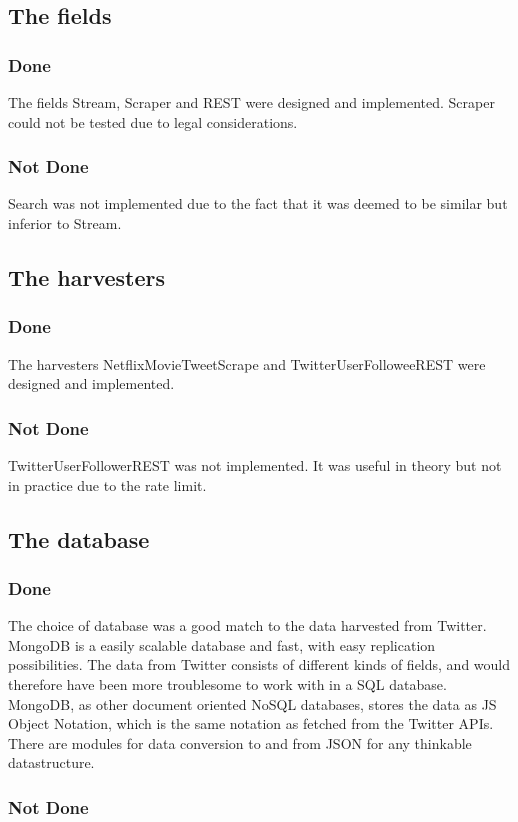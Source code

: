 \subsection{The fields}
\subsubsection{Done}
The fields Stream, Scraper and REST were designed and implemented. Scraper could not be tested due to legal considerations.
\subsubsection{Not Done}
Search was not implemented due to the fact that it was deemed to be similar but inferior to Stream.

\subsection{The harvesters}
\subsubsection{Done}
The harvesters NetflixMovieTweetScrape
and TwitterUserFolloweeREST were designed and implemented.
\subsubsection{Not Done}
TwitterUserFollowerREST was not implemented. It was useful in theory but not in practice due to the rate limit.

\subsection{The database}
\subsubsection{Done}
The choice of database was a good match to the data harvested from Twitter. MongoDB is a easily scalable database and fast, with easy replication possibilities. The data from Twitter consists of different kinds of fields, and would therefore have been more troublesome to work with in a SQL database. MongoDB, as other document oriented NoSQL databases, stores the data as JS Object Notation, which is the same notation as fetched from the Twitter APIs. There are modules for data conversion to and from JSON for any thinkable datastructure.

\subsubsection{Not Done}


